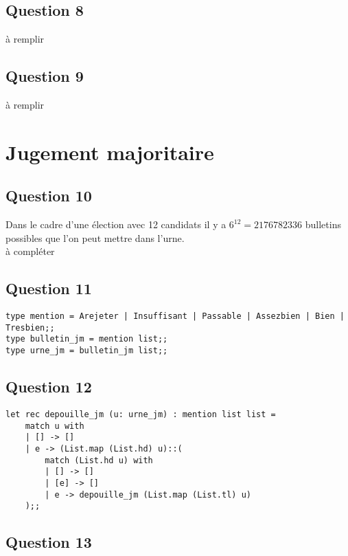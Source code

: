 \documentclass[french, 10pt, a4paper]{article}
\begin{document}
\subsection{Question 8}
à remplir



\subsection{Question 9}
à remplir



\section{Jugement majoritaire}

\subsection{Question 10}

Dans le cadre d'une élection avec 12 candidats il y a $ 6^{12} = 2176782336 $ bulletins possibles que l'on peut mettre dans l'urne.
\\à compléter



\subsection{Question 11}

\begin{verbatim}
type mention = Arejeter | Insuffisant | Passable | Assezbien | Bien | Tresbien;;
type bulletin_jm = mention list;;
type urne_jm = bulletin_jm list;;
\end{verbatim}



\subsection{Question 12}

\begin{verbatim}
let rec depouille_jm (u: urne_jm) : mention list list =
	match u with
	| [] -> []
	| e -> (List.map (List.hd) u)::(
		match (List.hd u) with
		| [] -> []
		| [e] -> []
		| e -> depouille_jm (List.map (List.tl) u)
	);;
\end{verbatim}



\subsection{Question 13}
\end{document}
